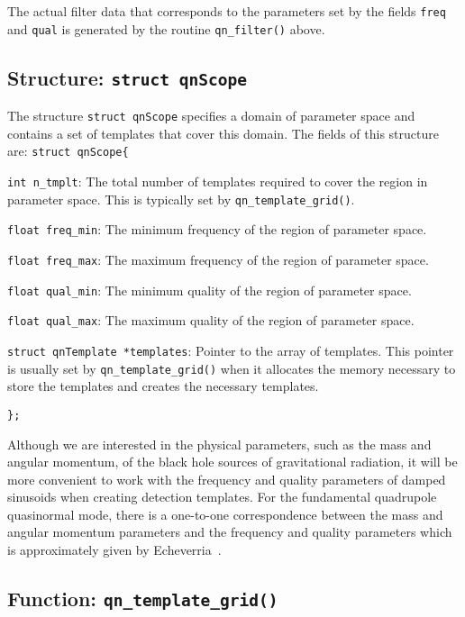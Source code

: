 The actual filter data that corresponds to the parameters set by the
fields \texttt{freq} and \texttt{qual} is generated by the routine
\texttt{qn\_filter()} above.


\clearpage
\subsection{Structure: \texttt{struct qnScope}}

The structure \texttt{struct qnScope} specifies a domain of parameter
space and contains a set of templates that cover this domain.  The fields
of this structure are: \texttt{struct qnScope\{}
\begin{description}
\item{\texttt{int n\_tmplt}}:  The total number of templates required to
  cover the region in parameter space.  This is typically set by
  \texttt{qn\_template\_grid()}.
\item{\texttt{float freq\_min}}:  The minimum frequency of the region of
  parameter space.
\item{\texttt{float freq\_max}}:  The maximum frequency of the region of
  parameter space.
\item{\texttt{float qual\_min}}:  The minimum quality of the region of
  parameter space.
\item{\texttt{float qual\_max}}:  The maximum quality of the region of
  parameter space.
\item{\texttt{struct qnTemplate *templates}}:  Pointer to the array of
  templates.  This pointer is usually set by \texttt{qn\_template\_grid()}
  when it allocates the memory necessary to store the templates and creates
  the necessary templates.
\end{description}
\texttt{\};}

Although we are interested in the physical parameters, such as the mass and
angular momentum, of the black hole sources of gravitational radiation, it
will be more convenient to work with the frequency and quality parameters
of damped sinusoids when creating detection templates.  For the fundamental
quadrupole quasinormal mode, there is a one-to-one correspondence between
the mass and angular momentum parameters and the frequency and quality
parameters which is
approximately given by Echeverria~\cite{echeverria:1989}.


\clearpage
\subsection{Function: \texttt{qn\_template\_grid()}}

